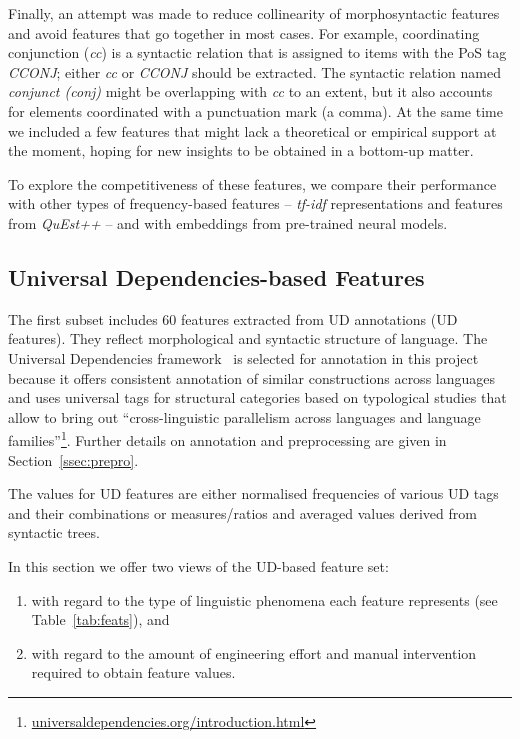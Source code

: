 Finally, an attempt was made to reduce collinearity of morphosyntactic features and avoid features that go together in most cases. For example, coordinating conjunction (\textit{cc}) is a syntactic relation that is assigned to items with the PoS tag \textit{CCONJ}; either \textit{cc} or \textit{CCONJ} should be extracted. The syntactic relation named \textit{conjunct (conj)} might be overlapping with \textit{cc} to an extent, but it also accounts for elements coordinated with a punctuation mark (a comma).
At the same time we included a few features that might lack a theoretical or empirical support at the moment, hoping for new insights to be obtained in a bottom-up matter.

To explore the competitiveness of these features, we compare their performance with other types of frequency-based features -- \textit{tf-idf} representations and features from \textit{QuEst++} -- and with embeddings from pre-trained neural models.

\subsection{\label{ssec:ud}Universal Dependencies-based Features}

The first subset includes 60 features extracted from \gls{UD} annotations (UD features). They reflect morphological and syntactic structure of language.
The Universal Dependencies framework~\cite{Straka2017} is selected for annotation in this project because it offers consistent annotation of similar constructions across languages and uses universal tags for structural categories based on typological studies that allow to bring out ``cross-linguistic parallelism across languages and language families''\footnote{\url{universaldependencies.org/introduction.html}}. Further details on annotation and preprocessing are given in Section~\ref{ssec:prepro}. 

The values for UD features are either normalised frequencies of various UD tags and their combinations or measures/ratios and averaged values derived from syntactic trees. 

In this section we offer two views of the UD-based feature set: 
\begin{enumerate}\compresslist{}
	\item with regard to the type of linguistic phenomena each feature represents (see Table~\ref{tab:feats}), and 
	\item with regard to the amount of engineering effort and manual intervention required to obtain feature values. 
\end{enumerate}


